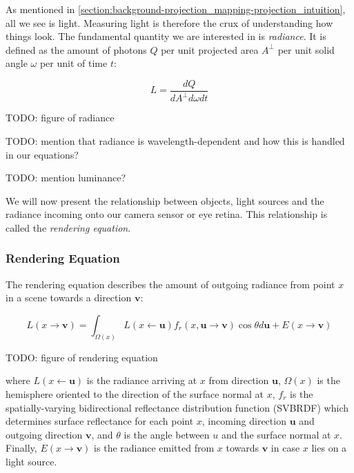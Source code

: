 As mentioned in \ref{section:background-projection_mapping-projection_intuition}, all we see is light. Measuring light is therefore the crux of understanding how things look. The fundamental quantity we are interested in is \textit{radiance}. It is defined as the amount of photons \(Q\) per unit projected area \(A^\perp \) per unit solid angle \(\omega\) per unit of time \(t\):

\begin{equation}
    \label{eq:radiance}
    L = \frac{dQ}{dA^\perp d\omega dt}
\end{equation}

{\color{red} TODO: figure of radiance}

{\color{red} TODO: mention that radiance is wavelength-dependent and how this is handled in our equations?}

{\color{red} TODO: mention luminance?}

We will now present the relationship between objects, light sources and the radiance incoming onto our camera sensor or eye retina. This relationship is called the \textit{rendering equation}.

\subsubsection{Rendering Equation}
\label{section:background-projection_mapping-light_transport-rendering_equation}

The rendering equation describes the amount of outgoing radiance from point \(x\) in a scene towards a direction \(\mathbf{v}\):

\begin{equation}
    \label{eq:rendering_equation}
    L(x \rightarrow \mathbf{v}) = \int_{\Omega(x)} L(x \leftarrow \mathbf{u}) f_r(x, \mathbf{u} \rightarrow \mathbf{v}) \cos \theta d\mathbf{u} + E(x \rightarrow \mathbf{v})
\end{equation}

{\color{red} TODO: figure of rendering equation}

where \(L(x \leftarrow \mathbf{u})\) is the radiance arriving at \(x\) from direction \(\mathbf{u}\), \(\Omega(x)\) is the hemisphere oriented to the direction of the surface normal at \(x\), \(f_r\) is the spatially-varying bidirectional reflectance distribution function (SVBRDF) which determines surface reflectance for each point \(x\), incoming direction \(\mathbf{u}\) and outgoing direction \(\mathbf{v}\), and \(\theta\) is the angle between \(u\) and the surface normal at \(x\). Finally, \(E(x \rightarrow \mathbf{v})\) is the radiance emitted from \(x\) towards \(\mathbf{v}\) in case \(x\) lies on a light source.

